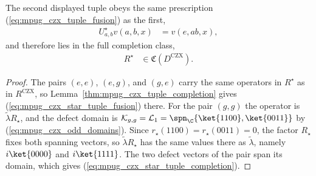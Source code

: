 \begin{lemma}
    \label{thm:mpug_czx_star_tuple_completion}
    \leanok
    The second displayed tuple obeys the same prescription
    (\ref{eq:mpug_czx_tuple_fusion}) as the first,
    \begin{align}
        U^\star_{a,b}v(a,b,x) & =v(e,ab,x),
        \label{eq:mpug_czx_star_tuple_fusion}
    \end{align}
    and therefore lies in the full completion class,
    \begin{align}
        R^\star & \in\mathfrak C(D^{\mathrm{CZX}}).
        \label{eq:mpug_czx_star_tuple_completion}
    \end{align}
\end{lemma}

\begin{proof}\leanok
    The pairs $(e,e)$, $(e,g)$, and $(g,e)$ carry the same operators in
    $R^\star$ as in $R^{\mathrm{CZX}}$, so
    Lemma~\ref{thm:mpug_czx_tuple_completion} gives
    (\ref{eq:mpug_czx_star_tuple_fusion}) there. For the pair $(g,g)$ the
    operator is $\tilde\lambda R_\star$, and the defect domain is
    $\mathcal K_{g,g}=\mathcal L_1=\spn_{\C}\{\ket{1100},\ket{0011}\}$ by
    (\ref{eq:mpug_czx_odd_domains}). Since
    $r_\star(1100)=r_\star(0011)=0$, the factor $R_\star$ fixes both spanning
    vectors, so $\tilde\lambda R_\star$ has the same values there as
    $\tilde\lambda$, namely $i\ket{0000}$ and $i\ket{1111}$. The two defect
    vectors of the pair span its domain, which gives
    (\ref{eq:mpug_czx_star_tuple_completion}).
\end{proof}

